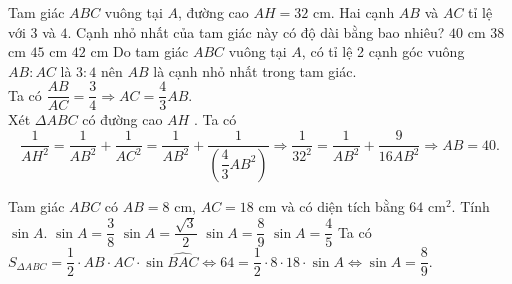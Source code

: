 \begin{ex}%
	Tam giác $ ABC$ vuông tại $ A$, đường cao $ AH=32$ cm. Hai cạnh $ AB$ và $ AC$ tỉ lệ với $ 3$ và $ 4$. Cạnh nhỏ nhất của tam giác này có độ dài bằng bao nhiêu?
	\choice
	{\True $ 40$ cm}
	{$ 38$ cm}
	{$ 45$ cm}
	{$ 42$ cm}
	\loigiai
	{Do tam giác $ ABC$ vuông tại $ A$, có tỉ lệ 2 cạnh góc vuông $ AB:AC$ là $ 3:4$ nên $ AB$ là cạnh nhỏ nhất trong tam giác.\\
		Ta có $ \dfrac{AB}{AC}=\dfrac{3}{4}\Rightarrow AC=\dfrac{4}{3}AB$.\\
		Xét $ \Delta ABC$ có  đường cao $ AH$ . Ta có\\
		$$\dfrac{1}{AH^2}=\dfrac{1}{AB^2}+\dfrac{1}{AC^2}=\dfrac{1}{AB^2}+\dfrac{1}{\left(\dfrac{4}{3}AB^2\right)}\Rightarrow \dfrac{1}{32^2}=\dfrac{1}{AB^2}+\dfrac{9}{16AB^2}\Rightarrow AB=40.$$}
\end{ex}



\begin{ex}%
	Tam giác $ ABC$ có $ AB=8$ cm, $ AC=18$ cm và có diện tích bằng $ 64$ cm$^2 $. Tính $ \sin A$.
	\choice
	{$ \sin A=\dfrac{3}{8}$}
	{$ \sin A=\dfrac{\sqrt{3}}{2}$}
	{\True $ \sin A=\dfrac{8}{9}$}
	{$ \sin A=\dfrac{4}{5}$}
	\loigiai
	{Ta có $ S_{\Delta ABC}=\dfrac{1}{2}\cdot AB\cdot AC\cdot \sin \widehat{BAC}\Leftrightarrow 64=\dfrac{1}{2}\cdot 8\cdot 18\cdot \sin A\Leftrightarrow \sin A=\dfrac{8}{9}$.}
\end{ex}


